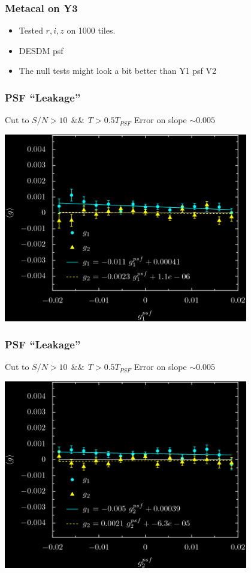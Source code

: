 \documentclass{beamer}
\begin{document}
\frame
{
    \frametitle{Metacal on Y3}

 
    \begin{itemize}

        \item Tested $r,i,z$ on 1000 tiles.

        \item DESDM psf

        \item The null tests might look a bit better than Y1 psf V2
            

    \end{itemize}

}

\frame
{
    \frametitle{PSF ``Leakage''}
 
   Cut to $S/N > 10~~ \&\&~~ T > 0.5 T_{PSF}$
   \newline
   Error on slope $\sim 0.005$


    \begin{center}
    \includegraphics[width=0.8\textwidth]{y3-ThalfTpsf-g1psf-inv.png}
    \end{center}


}

\frame
{
    \frametitle{PSF ``Leakage''}
 
   Cut to $S/N > 10 ~~ \&\& ~~ T > 0.5 T_{PSF}$
   \newline
   Error on slope $\sim 0.005$


    \begin{center}
    \includegraphics[width=0.8\textwidth]{y3-ThalfTpsf-g2psf-inv.png}
    \end{center}


}
\end{document}
